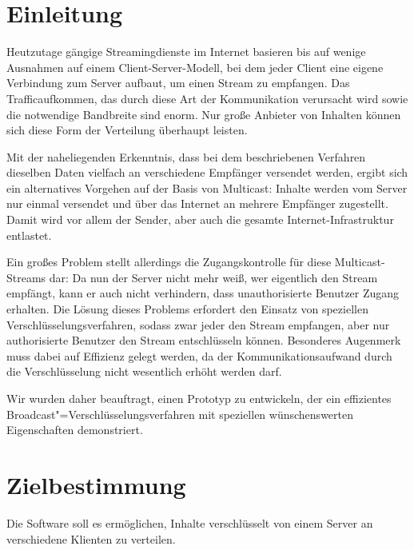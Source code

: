 \documentclass[a4paper,10pt]{article}
\title{\doctitle}
\author{\authorName}
\date{\today}
\begin{document}

\tableofcontents

\clearpage
\section{Einleitung}

Heutzutage gängige Streamingdienste im Internet basieren bis auf wenige Ausnahmen auf
einem Client-Server-Modell, bei dem jeder Client eine eigene Verbindung zum Server
aufbaut, um einen Stream zu empfangen. Das Trafficaufkommen, das durch diese Art der
Kommunikation verursacht wird sowie die notwendige Bandbreite sind enorm. Nur große
Anbieter von Inhalten können sich diese Form der Verteilung überhaupt leisten.

Mit der naheliegenden Erkenntnis, dass bei dem beschriebenen Verfahren dieselben Daten
vielfach an verschiedene Empfänger versendet werden, ergibt sich ein alternatives
Vorgehen auf der Basis von Multicast: Inhalte werden vom Server nur einmal versendet
und über das Internet an mehrere Empfänger zugestellt. Damit wird vor allem der Sender,
aber auch die gesamte Internet-Infrastruktur entlastet.

Ein großes Problem stellt allerdings die Zugangskontrolle für diese Multicast-Streams
dar: Da nun der Server nicht mehr weiß, wer eigentlich den Stream empfängt, kann
er auch nicht verhindern, dass unauthorisierte Benutzer Zugang erhalten. Die Lösung
dieses Problems erfordert den Einsatz von speziellen Verschlüsselungsverfahren,
sodass zwar jeder den Stream empfangen, aber nur authorisierte Benutzer den Stream
entschlüsseln können. Besonderes Augenmerk muss dabei auf Effizienz gelegt werden,
da der Kommunikationsaufwand durch die Verschlüsselung nicht wesentlich erhöht werden
darf.

Wir wurden daher beauftragt, einen Prototyp zu entwickeln, der ein effizientes
Broadcast"=Verschlüsselungsverfahren mit speziellen wünschenswerten Eigenschaften
demonstriert.
\begin{flushleft}

\end{flushleft}


\section{Zielbestimmung}
Die Software soll es ermöglichen, Inhalte verschlüsselt von einem Server an verschiedene Klienten zu verteilen.
\end{document}
